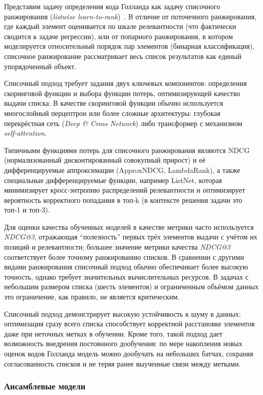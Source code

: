 Представим задачу определения кода Голланда как задачу списочного ранжирования (\emph{listwise learn-to-rank})~\cite{Burges}. В отличие от поточечного ранжирования, где каждый элемент оценивается по шкале релевантности (что фактически сводится к задаче регрессии), или от попарного ранжирования, в котором моделируется относительный порядок пар элементов (бинарная классификация), списочное ранжирование рассматривает весь список результатов как единый упорядоченный объект.

Списочный подход требует задания двух ключевых компонентов: определения скоринговой функции и выбора функции потерь, оптимизирующей качество выдачи списка. В качестве скоринговой функции обычно используется многослойный перцептрон или более сложные архитектуры: глубокая перекрёстная сеть (\emph{Deep {\&} Cross Network}) либо трансформер с механизмом \emph{self‑attention}.

Типичными функциями потерь для списочного ранжирования являются NDCG (нормализованный дисконтированный совокупный прирост) и её дифференцируемые аппроксимации (ApproxNDCG, LambdaRank), а также специальные дифференцируемые функции, например ListNet, которая минимизирует кросс‑энтропию распределений релевантности и оптимизирует вероятность корректного попадания в топ‑k (в контексте решения задачи это топ‑1 и топ‑3).

Для оценки качества обученных моделей в качестве метрики часто используется \emph{NDCG@3}, отражающая \enquote{полезность} первых трёх элементов выдачи с учётом их позиций и релевантности; большее значение метрики качества \emph{NDCG@3} соответствует более точному ранжированию списков. В сравнении с другими видами ранжирования списочный подход обычно обеспечивает более высокую точность, однако требует значительных вычислительных ресурсов. В задачах с небольшим размером списка (шесть элементов) и ограниченным объёмом данных это ограничение, как правило, не является критическим.

Списочный подход демонстрирует высокую устойчивость к шуму в данных: оптимизация сразу всего списка способствует корректной расстановке элементов даже при неточных метках в обучении. Кроме того, такой подход дает возможность внедрения постоянного дообучения: по мере накопления новых оценок кодов Голланда модель можно дообучать на небольших батчах, сохраняя согласованность списков и не теряя ранее выученные связи между метками.


\subsubsection{Ансамблевые модели}
\label{subsec:ensemble}

